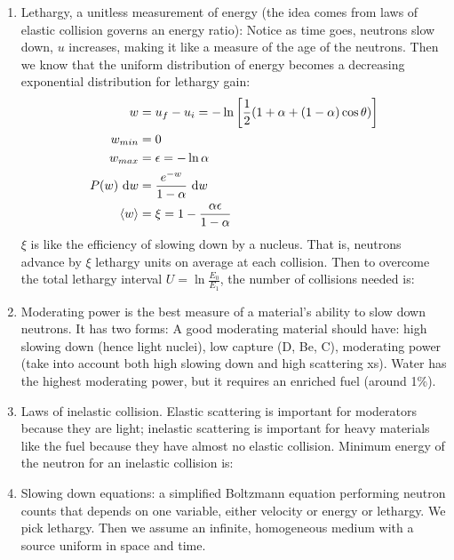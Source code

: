 \documentclass{school-22.211-notes}
\begin{document}
\begin{enumerate}
\item Lethargy, a unitless measurement of energy (the idea comes from laws of elastic collision governs an energy ratio):
Notice as time goes, neutrons slow down, $u$ increases, making it like a measure of the age of the neutrons. Then we know that the uniform distribution of energy becomes a decreasing exponential distribution for lethargy gain: 
\begin{align}
w &= u_f - u_i = -\ln \left[ \frac{1}{2} ( 1 + \alpha + (1-\alpha) \cos \theta ) \right] \\
w_{min} &= 0 \\
w_{max} &= \epsilon = -\ln \alpha \\
P(w) \mbox{ }\mathrm{d} w &= \frac{e^{-w}}{1 - \alpha} \mbox{ }\mathrm{d} w \\
\left< w \right> &= \xi = 1 - \frac{\alpha \epsilon}{1 - \alpha} 
\end{align}
$\xi$ is like the efficiency of slowing down by a nucleus. That is, neutrons advance by $\xi$ lethargy units on average at each collision. Then to overcome the total lethargy interval $U = \ln \frac{E_0}{E_1}$, the number of collisions needed is:

\item Moderating power is the best measure of a material's ability to slow down neutrons. It has two forms:
A good moderating material should have: high slowing down (hence light nuclei), low capture (D, Be, C), moderating power (take into account both high slowing down and high scattering xs). Water has the highest moderating power, but it requires an enriched fuel (around 1\%). 

\item Laws of inelastic collision. Elastic scattering is important for moderators because they are light; inelastic scattering is important for heavy materials like the fuel because they have almost no elastic collision. Minimum energy of the neutron for an inelastic collision is:

\item Slowing down equations: a simplified Boltzmann equation performing neutron counts that depends on one variable, either velocity or energy or lethargy. We pick lethargy. Then we assume an infinite, homogeneous medium with a source uniform in space and time. 


\end{enumerate}
\end{document}
